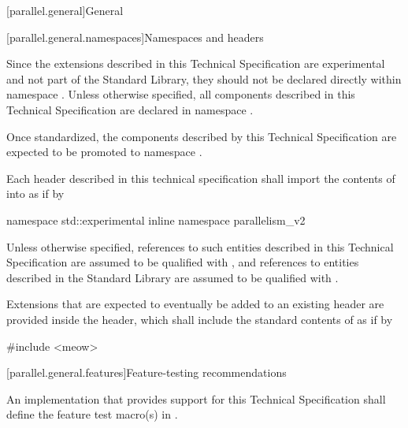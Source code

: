 
[parallel.general]{General}

[parallel.general.namespaces]{Namespaces and headers}

\pnum Since the extensions described in this Technical Specification are
experimental and not part of the \Cpp Standard Library, they should not be
declared directly within namespace . Unless otherwise specified, all
components described in this Technical Specification are declared in namespace
.

\begin{note}Once standardized, the components described by this Technical
Specification are expected to be promoted to namespace .\end{note}

\pnum
Each header described in this technical specification shall import the contents of  into  as if by
\begin{codeblock}
namespace std::experimental {
  inline namespace parallelism_v2 {}
}
\end{codeblock}

\pnum Unless otherwise specified, references to such entities described in this
Technical Specification are assumed to be qualified with
, and references to entities described
in the \Cpp Standard Library are assumed to be qualified with .

\pnum Extensions that are expected to eventually be added to an existing header  are provided inside the  header, which shall include the standard contents of  as if by

\begin{codeblock}
#include <meow>
\end{codeblock}

[parallel.general.features]{Feature-testing recommendations}

\pnum An implementation that provides support for this Technical Specification shall define the feature test macro(s) in .

